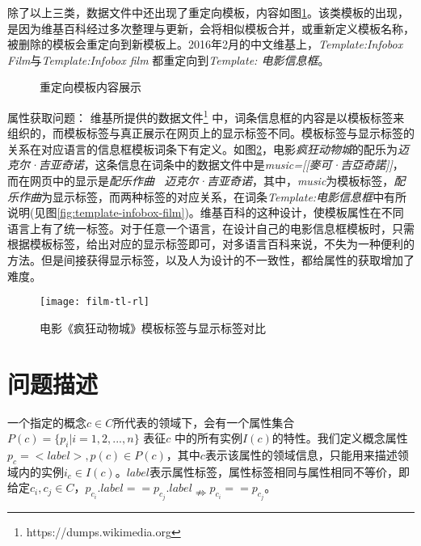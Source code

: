 除了以上三类，数据文件中还出现了{\heiti 重定向模板}，内容如图\ref{fig:template-redirect}。该类模板的出现，是因为维基百科经过多次整理与更新，会将相似模板合并，或重新定义模板名称，被删除的模板会重定向到新模板上。2016年2月的中文维基上，\textit{Template:Infobox Film}与\textit{Template:Infobox film} 都重定向到\textit{Template: 电影信息框}。

\begin{figure}[ht]
  \centering
  \caption{重定向模板内容展示}
  \label{fig:template-redirect}
\end{figure}

{\heiti 属性获取问题：}
维基所提供的数据文件\footnote{https://dumps.wikimedia.org} 中，词条信息框的内容是以{\heiti 模板标签}来组织的，而模板标签与真正展示在网页上的{\heiti 显示标签}不同。模板标签与显示标签的关系在对应语言的信息框模板词条下有定义。如图\ref{fig:film-tl-rl}，电影\textit{疯狂动物城}的配乐为\textit{迈克尔·吉亚奇诺}，这条信息在词条中的数据文件中是\textit{music=[[麥可·吉亞奇諾]]}，而在网页中的显示是\textit{配乐作曲 \ 迈克尔·吉亚奇诺}，其中，\textit{music}为模板标签，\textit{配乐作曲}为显示标签，而两种标签的对应关系，在词条\textit{Template:电影信息框}中有所说明(见图\ref{fig:template-infobox-film})。维基百科的这种设计，使模板属性在不同语言上有了统一标签。对于任意一个语言，在设计自己的电影信息框模板时，只需根据模板标签，给出对应的显示标签即可，对多语言百科来说，不失为一种便利的方法。但是间接获得显示标签，以及人为设计的不一致性，都给属性的获取增加了难度。

\begin{figure}[ht]
  \centering
  \texttt{[image: film-tl-rl]}
  \caption{电影《疯狂动物城》模板标签与显示标签对比}
  \label{fig:film-tl-rl}
\end{figure}

\section{问题描述}

一个指定的概念$c \in C$所代表的领域下，会有一个属性集合$P(c)=\{p_{i}|i=1,2,...,n\}$ 表征$c$ 中的所有实例$I(c)$的特性。我们定义概念属性$p_{c}= <label>, p(c) \in P(c)$，其中$c$表示该属性的领域信息，只能用来描述领域内的实例$i_{c} \in I(c)$。$label$表示属性标签，属性标签相同与属性相同不等价，即给定$c_i,c_j \in C$，$p_{c_i}.label == p_{c_j}.label\nRightarrow p_{c_i} == p_{c_j}$。

